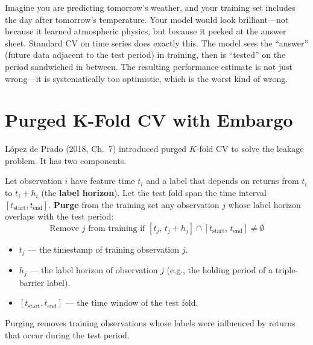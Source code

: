 \begin{intuition}
Imagine you are predicting tomorrow's weather, and your training set includes the day after tomorrow's temperature. Your model would look brilliant---not because it learned atmospheric physics, but because it peeked at the answer sheet. Standard CV on time series does exactly this. The model sees the ``answer'' (future data adjacent to the test period) in training, then is ``tested'' on the period sandwiched in between. The resulting performance estimate is not just wrong---it is systematically too optimistic, which is the worst kind of wrong.
\end{intuition}

\section{Purged K-Fold CV with Embargo}
\label{sec:purged-cv}

L\'{o}pez de Prado (2018, Ch.~7) introduced purged $K$-fold CV to solve the leakage problem. It has two components.

\begin{definition}[Purging]
Let observation $i$ have feature time $t_i$ and a label that depends on returns from $t_i$ to $t_i + h_i$ (the \textbf{label horizon}). Let the test fold span the time interval $[t_{\text{start}}, t_{\text{end}}]$. \textbf{Purge} from the training set any observation $j$ whose label horizon overlaps with the test period:
\begin{equation}
\text{Remove } j \text{ from training if } [t_j, \, t_j + h_j] \cap [t_{\text{start}}, \, t_{\text{end}}] \neq \emptyset
\label{eq:purge}
\end{equation}
\begin{itemize}[nosep]
  \item $t_j$ --- the timestamp of training observation $j$.
  \item $h_j$ --- the label horizon of observation $j$ (e.g., the holding period of a triple-barrier label).
  \item $[t_{\text{start}}, t_{\text{end}}]$ --- the time window of the test fold.
\end{itemize}
Purging removes training observations whose labels were influenced by returns that occur during the test period.
\end{definition}

